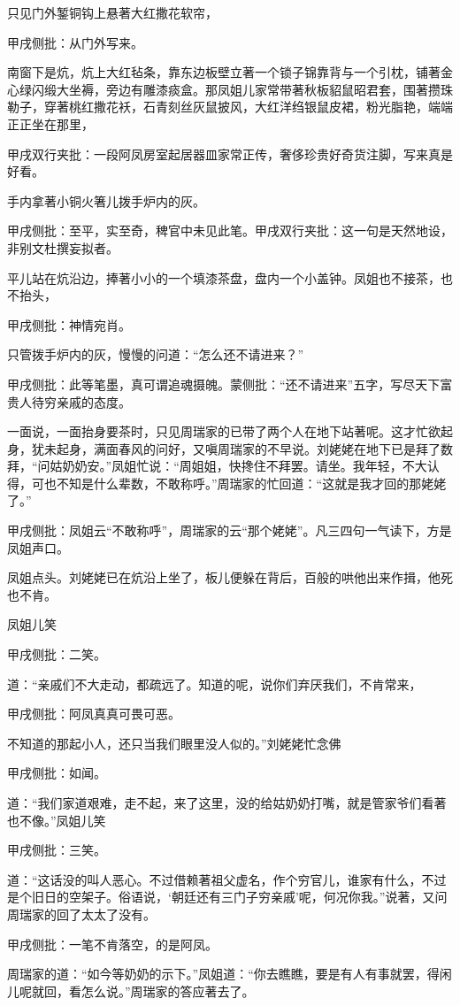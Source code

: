 \begin{parag}

    只见门外錾铜钩上悬著大红撒花软帘，\begin{note}甲戌侧批：从门外写来。\end{note}南窗下是炕，炕上大红毡条，靠东边板壁立著一个锁子锦靠背与一个引枕，铺著金心绿闪缎大坐褥，旁边有雕漆痰盒。那凤姐儿家常带著秋板貂鼠昭君套，围著攒珠勒子，穿著桃红撒花袄，石青刻丝灰鼠披风，大红洋绉银鼠皮裙，粉光脂艳，端端正正坐在那里，\begin{note}甲戌双行夹批：一段阿凤房室起居器皿家常正传，奢侈珍贵好奇货注脚，写来真是好看。\end{note}手内拿著小铜火箸儿拨手炉内的灰。\begin{note}甲戌侧批：至平，实至奇，稗官中未见此笔。甲戌双行夹批：这一句是天然地设，非别文杜撰妄拟者。\end{note}平儿站在炕沿边，捧著小小的一个填漆茶盘，盘内一个小盖钟。凤姐也不接茶，也不抬头，\begin{note}甲戌侧批：神情宛肖。\end{note}只管拨手炉内的灰，慢慢的问道：“怎么还不请进来？”\begin{note}甲戌侧批：此等笔墨，真可谓追魂摄魄。蒙侧批：“还不请进来”五字，写尽天下富贵人待穷亲戚的态度。\end{note}一面说，一面抬身要茶时，只见周瑞家的已带了两个人在地下站著呢。这才忙欲起身，犹未起身，满面春风的问好，又嗔周瑞家的不早说。刘姥姥在地下已是拜了数拜，“问姑奶奶安。”凤姐忙说：“周姐姐，快搀住不拜罢。请坐。我年轻，不大认得，可也不知是什么辈数，不敢称呼。”周瑞家的忙回道：“这就是我才回的那姥姥了。”\begin{note}甲戌侧批：凤姐云“不敢称呼”，周瑞家的云“那个姥姥”。凡三四句一气读下，方是凤姐声口。\end{note}凤姐点头。刘姥姥已在炕沿上坐了，板儿便躲在背后，百般的哄他出来作揖，他死也不肯。
\end{parag}


\begin{parag}

    凤姐儿笑\begin{note}甲戌侧批：二笑。\end{note}道：“亲戚们不大走动，都疏远了。知道的呢，说你们弃厌我们，不肯常来，\begin{note}甲戌侧批：阿凤真真可畏可恶。\end{note}不知道的那起小人，还只当我们眼里没人似的。”刘姥姥忙念佛\begin{note}甲戌侧批：如闻。\end{note}道：“我们家道艰难，走不起，来了这里，没的给姑奶奶打嘴，就是管家爷们看著也不像。”凤姐儿笑\begin{note}甲戌侧批：三笑。\end{note}道：“这话没的叫人恶心。不过借赖著祖父虚名，作个穷官儿，谁家有什么，不过是个旧日的空架子。俗语说，‘朝廷还有三门子穷亲戚’呢，何况你我。”说著，又问周瑞家的回了太太了没有。\begin{note}甲戌侧批：一笔不肯落空，的是阿凤。\end{note}周瑞家的道：“如今等奶奶的示下。”凤姐道：“你去瞧瞧，要是有人有事就罢，得闲儿呢就回，看怎么说。”周瑞家的答应著去了。
\end{parag}


